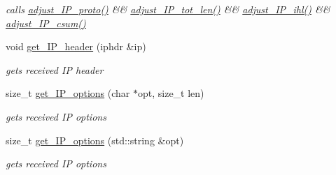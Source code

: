 \begin{CompactItemize}
\begin{CompactList}\small\item\em calls \hyperlink{classsocketpp_1_1IP__RawSocket_9da491fc93102503788425402d8fd477}{adjust\_\-IP\_\-proto()} \&\& \hyperlink{classsocketpp_1_1IP__RawSocket_32d2c08139fb43abb92679bdabecf778}{adjust\_\-IP\_\-tot\_\-len()} \&\& \hyperlink{classsocketpp_1_1IP__RawSocket_d84d5e193a15baf421c64011a9c27359}{adjust\_\-IP\_\-ihl()} \&\& \hyperlink{classsocketpp_1_1IP__RawSocket_187bab79c6a8bae17b400a132063a9d1}{adjust\_\-IP\_\-csum()} \item\end{CompactList}\item 
void \hyperlink{classsocketpp_1_1IP__RawSocket_e477f483d5a8baa76c60399d0809d043}{get\_\-IP\_\-header} (iphdr \&ip)
\begin{CompactList}\small\item\em gets received IP header \item\end{CompactList}\item 
size\_\-t \hyperlink{classsocketpp_1_1IP__RawSocket_686fcc72997b0843b2ece0c4d8a5735d}{get\_\-IP\_\-options} (char $\ast$opt, size\_\-t len)
\begin{CompactList}\small\item\em gets received IP options \item\end{CompactList}\item 
size\_\-t \hyperlink{classsocketpp_1_1IP__RawSocket_c9bec0c1db60871bb1cb5560b97e02ed}{get\_\-IP\_\-options} (std::string \&opt)
\begin{CompactList}\small\item\em gets received IP options \item\end{CompactList}\end{CompactItemize}

